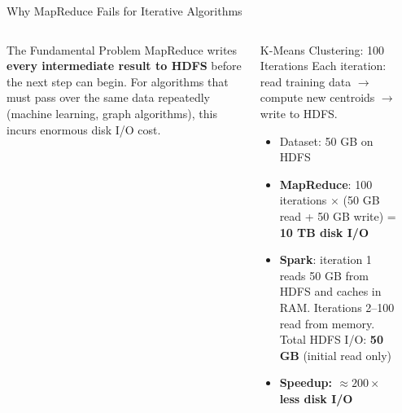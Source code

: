 \documentclass[aspectratio=169,10pt]{beamer}
\begin{document}
\begin{frame}{Why MapReduce Fails for Iterative Algorithms}
  \begin{columns}[T]
      \begin{block}{The Fundamental Problem}
        MapReduce writes \textbf{every intermediate result to HDFS} before the next step can begin.  For algorithms that must pass over the same data repeatedly (machine learning, graph algorithms), this incurs enormous disk I/O cost.
      \end{block}
      \vspace{4pt}
      \begin{exampleblock}{K-Means Clustering: 100 Iterations}
        \small Each iteration: read training data $\to$ compute new centroids $\to$ write to HDFS.
        \vspace{4pt}
        \begin{itemize}
          \item Dataset: 50 GB on HDFS
          \item \textbf{MapReduce}: 100 iterations $\times$ (50 GB read + 50 GB write) = \textbf{10 TB disk I/O}
          \item \textbf{Spark}: iteration 1 reads 50 GB from HDFS and caches in RAM.  Iterations 2--100 read from memory.  Total HDFS I/O: \textbf{50 GB} (initial read only)
          \item \textbf{Speedup: $\approx 200\times$ less disk I/O}
        \end{itemize}
      \end{exampleblock}

      \begin{center}
\end{center}
\end{columns}
\end{frame}
\end{document}
